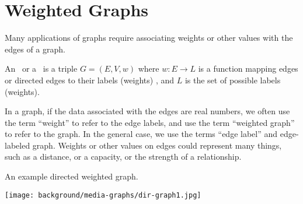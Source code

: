 \section{Weighted Graphs}
\label{sec:bg::graphs::weighted}

\begin{cluster}
\label{grp:grm:bg::graphs::applications}

\begin{gram}
\label{grm:bg::graphs::applications}
\label{sec:bg::graphs::weighted}
\begin{gram}
Many applications of graphs require associating weights or other
values with the edges of a graph.  
\end{gram}

\end{gram}
\end{cluster}

\begin{cluster}
\label{grp:def:bg::graphs::weighted}

\begin{definition}
\label{def:bg::graphs::weighted}
An ~or a ~is a triple
$G = (E,V,w)$ where $w\!: E \to L$ is a function mapping edges or
directed edges to their labels (weights) , and $L$ is the set of
possible labels (weights).

\end{definition}
\end{cluster}

\begin{cluster}
\label{grp:grm:bg::graphs::graph}

\begin{gram}
\label{grm:bg::graphs::graph}
In a graph, if the data associated with the edges are real numbers, we
often use the term ``weight'' to refer to the edge labels, and use the
term ``weighted graph'' to refer to the graph.  In the general case,
we use the terms ``edge label'' and edge-labeled graph.  Weights or
other values on edges could represent many things, such as a distance,
or a capacity, or the strength of a relationship.

\end{gram}
\end{cluster}

\begin{cluster}
\label{grp:xmpl:bg::graphs::directed}

\begin{example}
\label{xmpl:bg::graphs::directed}
An example directed weighted graph.

\begin{center}
\texttt{[image: background/media-graphs/dir-graph1.jpg]}
\end{center}

\end{example}
\end{cluster}

